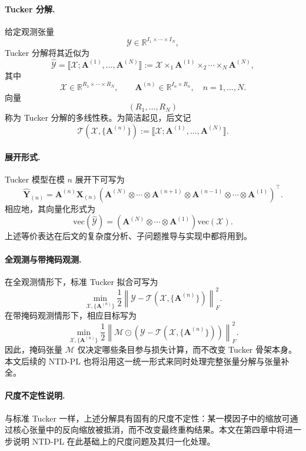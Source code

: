 \paragraph{Tucker 分解.}
给定观测张量
\[
\mathcal{Y}\in\mathbb{R}^{I_1\times\cdots\times I_N},
\]
Tucker 分解将其近似为
\[
\widehat{\mathcal{Y}}
=
\llbracket
\mathcal{X};
\mathbf{A}^{(1)},\dots,\mathbf{A}^{(N)}
\rrbracket
:=
\mathcal{X}
\times_1 \mathbf{A}^{(1)}
\times_2 \cdots
\times_N \mathbf{A}^{(N)},
\]
其中
\[
\mathcal{X}\in\mathbb{R}^{R_1\times\cdots\times R_N},
\qquad
\mathbf{A}^{(n)}\in\mathbb{R}^{I_n\times R_n},\quad n=1,\dots,N.
\]
向量
\[
(R_1,\dots,R_N)
\]
称为 Tucker 分解的多线性秩。为简洁起见，后文记
\[
\mathcal{T}(\mathcal{X},\{\mathbf{A}^{(n)}\})
:=
\llbracket
\mathcal{X};
\mathbf{A}^{(1)},\dots,\mathbf{A}^{(N)}
\rrbracket .
\]

\paragraph{展开形式.}
Tucker 模型在模 $n$ 展开下可写为
\[
\widehat{\mathbf{Y}}_{(n)}
=
\mathbf{A}^{(n)}
\mathbf{X}_{(n)}
\left(
\mathbf{A}^{(N)}\otimes\cdots\otimes
\mathbf{A}^{(n+1)}\otimes
\mathbf{A}^{(n-1)}\otimes\cdots\otimes
\mathbf{A}^{(1)}
\right)^\top.
\]
相应地，其向量化形式为
\[
\mathrm{vec}(\widehat{\mathcal{Y}})
=
\left(
\mathbf{A}^{(N)}\otimes\cdots\otimes\mathbf{A}^{(1)}
\right)
\mathrm{vec}(\mathcal{X}).
\]
上述等价表达在后文的复杂度分析、子问题推导与实现中都将用到。

\paragraph{全观测与带掩码观测.}
在全观测情形下，标准 Tucker 拟合可写为
\[
\min_{\mathcal{X},\{\mathbf{A}^{(n)}\}}
\frac{1}{2}
\left\|
\mathcal{Y}
-
\mathcal{T}(\mathcal{X},\{\mathbf{A}^{(n)}\})
\right\|_F^2.
\]
在带掩码观测情形下，相应目标写为
\[
\min_{\mathcal{X},\{\mathbf{A}^{(n)}\}}
\frac{1}{2}
\left\|
\mathcal{M}\odot
\left(
\mathcal{Y}
-
\mathcal{T}(\mathcal{X},\{\mathbf{A}^{(n)}\})
\right)
\right\|_F^2.
\]
因此，掩码张量 $\mathcal{M}$ 仅决定哪些条目参与损失计算，而不改变 Tucker 骨架本身。本文后续的 NTD-PL 也将沿用这一统一形式来同时处理完整张量分解与张量补全。

\paragraph{尺度不定性说明.}
与标准 Tucker 一样，上述分解具有固有的尺度不定性：某一模因子中的缩放可通过核心张量中的反向缩放被抵消，而不改变最终重构结果。本文在第四章中将进一步说明 NTD-PL 在此基础上的尺度问题及其归一化处理。

